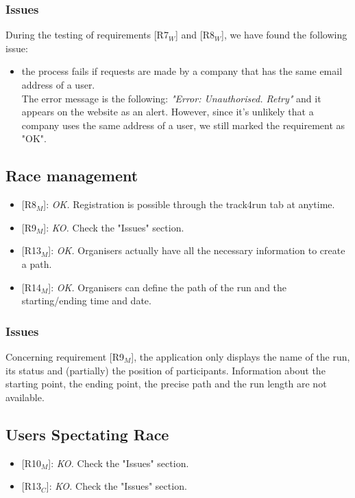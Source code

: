 \documentclass{article}
\begin{document}
\subsubsection{Issues}
During the testing of requirements {[R7$_W$]} and {[R8$_W$]}, we have found the following issue:
\begin{itemize}
	\item the process fails if requests are made by a company that has the same email address of a user. \\The error message is the following: \textit{"Error: Unauthorised. Retry"} and it appears on the website as an alert. However, since it's unlikely that a company uses the same address of a user, we still marked the requirement as "OK".
\end{itemize}

\subsection{Race management}
\begin{itemize}
	\item {[R8$_M$]}: \textit{OK.} Registration is possible through the track4run tab at anytime.
	\item {[R9$_M$]}: \textit{KO.} Check the "Issues" section.
	\item {[R13$_M$]}: \textit{OK.} Organisers actually have all the necessary information to create a path.
	\item {[R14$_M$]}: \textit{OK.} Organisers can define the path of the run and the starting/ending time and date.
\end{itemize}

\subsubsection{Issues}
Concerning requirement {[R9$_M$]}, the application only displays the name of the run, its status and (partially) the position of participants. Information about the starting point, the ending point, the precise path and the run length are not available.

\subsection{Users Spectating Race}
\begin{itemize}
	\item {[R10$_M$]}: \textit{KO.} Check the "Issues" section.
	\item {[R13$_C$]}: \textit{KO.} Check the "Issues" section.
\end{itemize}
\end{document}
